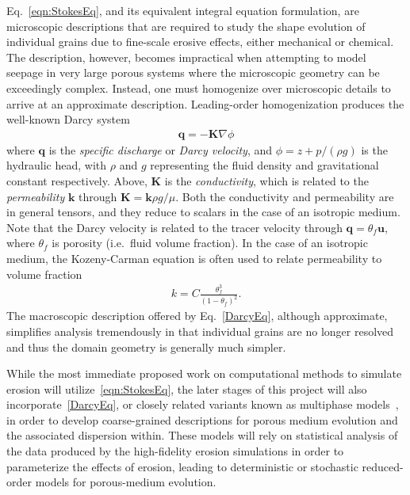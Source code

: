 \documentclass[11pt]{article}
\newcommand{\bvec}[1]{{\mathbf{#1}}}
\newcommand{\grad}{\nabla}
\newcommand{\uu}{\bvec{u}}
\newcommand {\qq} {\bvec{q}}
\begin{document}
Eq.~\eqref{eqn:StokesEq}, and its equivalent integral equation formulation, are microscopic descriptions that are required to study the shape evolution of individual grains due to fine-scale erosive effects, either mechanical or chemical. The description, however, becomes impractical when attempting to model seepage in very large porous systems where the microscopic geometry can be exceedingly complex. Instead, one must homogenize over microscopic details to arrive at an approximate description. Leading-order homogenization produces the well-known Darcy system 
\begin{align}
  \label{DarcyEq}
  \qq = - \bvec{K} \grad \phi
\end{align}
where $\qq$ is the {\em specific discharge} or {\em Darcy velocity}, and $\phi = z + p/(\rho g)$ is the hydraulic head, with $\rho$ and $g$ representing the fluid density and gravitational constant respectively.  Above, $\bvec{K}$ is the {\em conductivity}, which is related to the {\em permeability} $\bvec{k}$ through $\bvec{K} = \bvec{k} \rho g/\mu$.  Both the conductivity and permeability are in general tensors, and they reduce to scalars in the case of an isotropic medium. Note that the Darcy velocity is related to the tracer velocity through $\qq = \theta_f \uu$, where $\theta_f$ is porosity (i.e.~fluid volume fraction).  In the case of an isotropic medium, the Kozeny-Carman equation is often used to relate permeability to volume fraction~\cite{bear2013dynamics}
\begin{align}
  k = C \frac{\theta_f^3}{(1-\theta_f)^2}.
\end{align}
The macroscopic description offered by Eq.~\eqref{DarcyEq}, although approximate, simplifies analysis tremendously in that individual grains are no longer resolved and thus the domain geometry is generally much simpler.

While the most immediate proposed work on computational methods to
simulate erosion will utilize~\eqref{eqn:StokesEq}, the later stages of this project will also incorporate~\eqref{DarcyEq}, or closely related variants known as multiphase models~\cite{Imma2019, eastham2019multiphase}, in order to develop coarse-grained descriptions for porous medium evolution and the associated dispersion within. These models will rely on statistical analysis of the data produced by the high-fidelity erosion simulations in order to parameterize the effects of erosion, leading to deterministic or stochastic reduced-order models for porous-medium evolution. 
\end{document}
